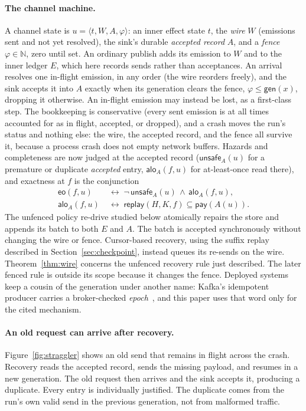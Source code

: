 \documentclass[sigplan,10pt]{acmart}
\theoremstyle{plain}
\theoremstyle{definition}
\newcommand{\replay}{\mathsf{replay}}      %
\newcommand{\scope}{K}                     %
\newcommand{\gen}{\mathsf{gen}}            %
\newcommand{\pay}{\mathsf{pay}}            %
\newcommand{\unsafe}{\mathsf{unsafe}}
\newcommand{\alo}{\mathsf{alo}}            %
\newcommand{\eo}{\mathsf{eo}}              %
\begin{document}
\paragraph{The channel machine.}
A channel state is $u = \langle t, W, A, \varphi \rangle$: an inner
effect state $t$, the \emph{wire} $W$ (emissions sent and not yet
resolved), the sink's durable \emph{accepted record} $A$, and a
\emph{fence} $\varphi \in \mathbb{N}$, zero until set. An ordinary publish adds its
emission to $W$ and to the inner ledger $E$, which here records sends
rather than acceptances. An arrival resolves one in-flight emission, in any order
(the wire reorders freely), and the sink accepts it into $A$ exactly
when its generation clears the fence, $\varphi \le \gen(x)$, dropping
it otherwise. An in-flight emission may instead be lost, as a
first-class step. The bookkeeping is conservative (every sent emission
is at all times accounted for as in flight, accepted, or dropped), and
a crash moves the run's status and nothing else: the wire, the accepted
record, and the fence all survive it, because a process crash does not
empty network buffers. Hazards and completeness are now judged at the
accepted record ($\unsafe_A(u)$ for a premature or duplicate
\emph{accepted} entry, $\alo_A(f,u)$ for at-least-once read there), and
exactness at $f$ is the conjunction
\[
\begin{aligned}
  \eo(f,u) \;&\longleftrightarrow\;
     \neg\,\unsafe_A(u) \,\wedge\, \alo_A(f,u),\\
  \alo_A(f,u) \;&\longleftrightarrow\;
     \replay(H,\scope,f) \subseteq \pay(A(u)).
\end{aligned}
\]
The unfenced policy re-drive studied below atomically repairs the
store and appends its batch to both $E$ and $A$. The batch is accepted
synchronously without changing the wire or fence. Cursor-based
recovery, using the suffix replay described in
Section~\ref{sec:checkpoint}, instead queues its re-sends on the wire.
Theorem~\ref{thm:wire} concerns the unfenced recovery rule just
described. The later fenced rule is outside its scope because it
changes the fence.
Deployed systems keep a cousin of the generation under another name:
Kafka's idempotent producer carries a broker-checked
\emph{epoch}~\cite{kip98}, and this paper uses that word only for the
cited mechanism.

\paragraph{An old request can arrive after recovery.}
Figure~\ref{fig:straggler} shows an old send that remains in flight
across the crash. Recovery reads the accepted record, sends the missing
payload, and resumes in a new generation. The old request then arrives
and the sink accepts it, producing a duplicate. Every entry is
individually justified. The duplicate comes from the run's own valid
send in the previous generation, not from malformed traffic.
\end{document}
